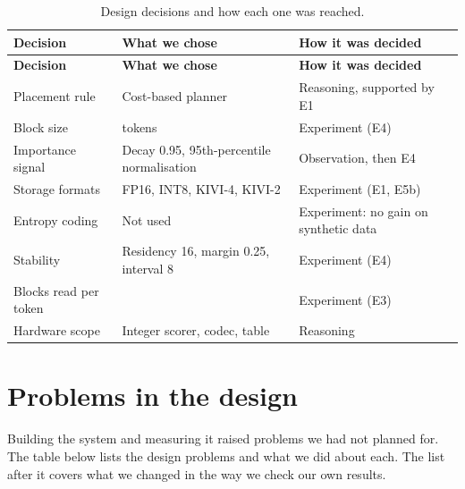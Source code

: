 \documentclass[12pt,a4paper]{report}
\begin{document}
{\fontsize{9}{10.5}\selectfont\setlength{\tabcolsep}{3pt}
\begin{longtable}{>{\raggedright\arraybackslash}p{1.45in}>{\raggedright\arraybackslash}p{2.35in}>{\raggedright\arraybackslash}p{2.17in}}
\caption{Design decisions and how each one was reached.}\\
\toprule
\textbf{Decision} & \textbf{What we chose} & \textbf{How it was decided} \\\midrule\endfirsthead
\toprule \textbf{Decision} & \textbf{What we chose} & \textbf{How it was decided} \\\midrule\endhead
\bottomrule\endfoot
Placement rule & Cost-based planner & Reasoning, supported by E1 \\
Block size & 16 tokens & Experiment (E4) \\
Importance signal & Decay 0.95, 95th-percentile normalisation & Observation, then E4 \\
Storage formats & FP16, INT8, KIVI-4, KIVI-2 & Experiment (E1, E5b) \\
Entropy coding & Not used & Experiment: no gain on synthetic data \\
Stability & Residency 16, margin 0.25, interval 8 & Experiment (E4) \\
Blocks read per token & 24 & Experiment (E3) \\
Hardware scope & Integer scorer, codec, table & Reasoning \\
\bottomrule
\end{longtable}}
\section{Problems in the design}
Building the system and measuring it raised problems we had not planned for. The table below lists the design problems and what we did about each. The list after it covers what we changed in the way we check our own results.
\end{document}
